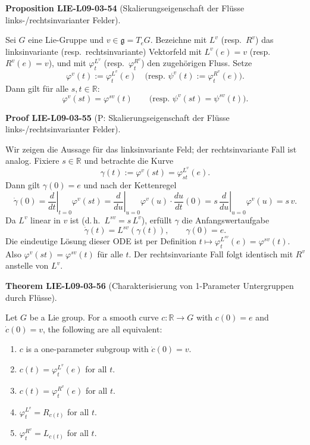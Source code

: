 \documentclass[10pt, letterpaper]{article}
\newcommand{\CustomHeading}[3]{%
  \par\medskip\noindent%
  \textbf{#1 #2} \textnormal{(#3)}.\enskip%
}
\newenvironment{PROP}[2]{\CustomHeading{Proposition}{#1}{#2}}{}
\newenvironment{THEO}[2]{\CustomHeading{Theorem}{#1}{#2}}{}
\newenvironment{PROOF}[2]{\CustomHeading{Proof}{#1}{#2}}{}
\begin{document}
\begin{PROP}{LIE-L09-03-54}{Skalierungseigenschaft der Flüsse links-/rechtsinvarianter Felder}
Sei $G$ eine Lie-Gruppe und $v\in\mathfrak g=T_eG$. Bezeichne mit $L^{v}$ (resp.\ $R^{v}$)
das linksinvariante (resp.\ rechtsinvariante) Vektorfeld mit $L^{v}(e)=v$ (resp.\ $R^{v}(e)=v$),
und mit $\varphi_t^{L^{v}}$ (resp.\ $\varphi_t^{R^{v}}$) den zugehörigen Fluss.
Setze
\[
\varphi^{v}(t):=\varphi_t^{L^{v}}(e)\quad\text{(resp.\ }\psi^{v}(t):=\varphi_t^{R^{v}}(e)\text{)}.
\]
Dann gilt für alle $s,t\in\mathbb R$:
\[
\varphi^{v}(s t)=\varphi^{s v}(t)
\qquad\text{(resp.\ }\psi^{v}(s t)=\psi^{s v}(t)\text{)}.
\]
\end{PROP}

\begin{PROOF}{LIE-L09-03-55}{P: Skalierungseigenschaft der Flüsse links-/rechtsinvarianter Felder}
Wir zeigen die Aussage für das linksinvariante Feld; der rechtsinvariante Fall ist analog.
Fixiere $s\in\mathbb R$ und betrachte die Kurve
\[
\gamma(t):=\varphi^{v}(s t)=\varphi_{s t}^{L^{v}}(e).
\]
Dann gilt $\gamma(0)=e$ und nach der Kettenregel
\[
\dot\gamma(0)=\left.\frac{d}{dt}\right|_{t=0}\varphi^{v}(s t)
=\left.\frac{d}{du}\right|_{u=0}\varphi^{v}(u)\cdot \frac{du}{dt}(0)
=s\,\left.\frac{d}{du}\right|_{u=0}\varphi^{v}(u)=s\,v.
\]
Da $L^{v}$ linear in $v$ ist (d.\,h.\ $L^{s v}=s\,L^{v}$), erfüllt $\gamma$ die Anfangswertaufgabe
\[
\dot\gamma(t)=L^{s v}(\gamma(t)),\qquad \gamma(0)=e.
\]
Die eindeutige Lösung dieser ODE ist per Definition $t\mapsto \varphi_t^{L^{s v}}(e)=\varphi^{s v}(t)$.
Also $\varphi^{v}(s t)=\varphi^{s v}(t)$ für alle $t$. Der rechtsinvariante Fall folgt identisch
mit $R^{v}$ anstelle von $L^{v}$.
\end{PROOF}

\begin{THEO}{LIE-L09-03-56}{Charakterisierung von 1-Parameter Untergruppen durch Flüsse}
Let $G$ be a Lie group. For a smooth curve $c: \mathbb{R} \rightarrow G$ with $c(0)=e$ and $\dot{c}(0)=v$, the following are all equivalent:
\begin{enumerate}
\item $c$ is a one-parameter subgroup with $\dot{c}(0)=v$.
\item $c(t)=\varphi_{t}^{L^{v}}(e)$ for all $t$.
\item $c(t)=\varphi_{t}^{R^{v}}(e)$ for all $t$.
\item $\varphi_{t}^{L^{v}}=R_{c(t)}$ for all $t$.
\item $\varphi_{t}^{R^{v}}=L_{c(t)}$ for all $t$.
\end{enumerate}
\end{THEO}
\end{document}

